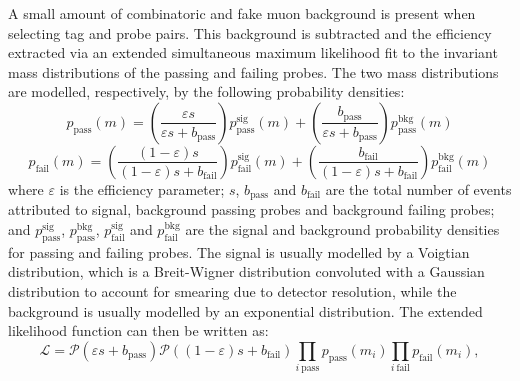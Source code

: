 A small amount of combinatoric and fake muon background is present when 
selecting tag and probe pairs.
This background is subtracted and the efficiency extracted via an extended 
simultaneous maximum likelihood fit to the invariant mass distributions of the 
passing and failing probes. The two mass distributions are modelled, 
respectively, by the following probability densities:
\begin{equation}
p_{\mathrm{pass}}(m) = \left(\frac{\varepsilon s}{\varepsilon s + 
b_{\mathrm{pass}}}\right) p_{\mathrm{pass}}^{\mathrm{sig}}(m) + 
\left(\frac{b_{\mathrm{pass}}}{\varepsilon s + b_{\mathrm{pass}}}\right) 
p_{\mathrm{pass}}^{\mathrm{bkg}}(m)
\end{equation}
\begin{equation}
p_{\mathrm{fail}}(m) = \left(\frac{(1 - \varepsilon )s}{(1 - \varepsilon)s + 
b_{\mathrm{fail}}}\right) p_{\mathrm{fail}}^{\mathrm{sig}}(m) + 
\left(\frac{b_{\mathrm{fail}}}{(1 - \varepsilon)s + b_{\mathrm{fail}}}\right) 
p_{\mathrm{fail}}^{\mathrm{bkg}}(m)
\end{equation}
where $\varepsilon$ is the efficiency parameter; $s$, $b_{\mathrm{pass}}$ and 
$b_{\mathrm{fail}}$ are the total number of 
events attributed to signal, background passing probes and background failing 
probes; and $p_{\mathrm{pass}}^{\mathrm{sig}}$, 
$p_{\mathrm{pass}}^{\mathrm{bkg}}$, $p_{\mathrm{fail}}^{\mathrm{sig}}$ and 
$p_{\mathrm{fail}}^{\mathrm{bkg}}$ are the signal and background probability 
densities for passing and failing probes. The signal is usually modelled by a 
Voigtian distribution, which is a Breit-Wigner distribution convoluted with a 
Gaussian distribution to account for smearing due to detector resolution, while 
the background is usually modelled by an exponential distribution.
The extended likelihood function can then be written as:
\begin{equation}
\mathcal{L} = \mathcal{P}(\varepsilon s + 
b_{\mathrm{pass}}) \mathcal{P}((1 - \varepsilon)s + 
b_{\mathrm{fail}}) 
\prod_{i~\mathrm{pass}} p_{\mathrm{pass}}(m_i) \prod_{i~\mathrm{fail}} 
p_{\mathrm{fail}}(m_i), 
\end{equation}

